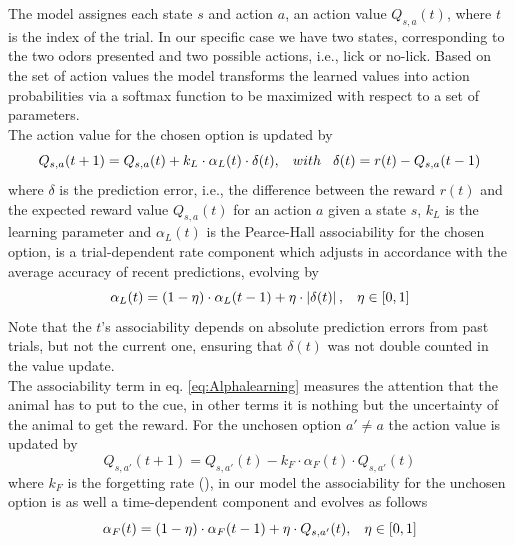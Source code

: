 The model assignes each state $s$ and action $a$, an action value $Q_{s,a}(t)$, where $t$ is the index of the trial. In our specific case we have two states, corresponding to the two odors presented and two possible actions, i.e., lick or no-lick. 
Based on the set of action values the model transforms the learned values into action probabilities via a softmax function to be maximized with respect to a set of parameters.\\The action value for the chosen option is updated by
\begin{equation}
Q_{s,a}(t+1)  = Q_{s,a}(t)+k_L\cdot\alpha_L(t)\cdot\delta(t), \hspace{0.3cm} with \hspace{0.3cm}\delta(t)=r(t)-Q_{s,a}(t-1)
\label{eq:Qlearning}
\end{equation}
where $\delta$ is the prediction error, i.e., the difference between the reward $r(t)$ and the expected reward value $Q_{s,a}(t)$ for an action $a$ given a state $s$, $k_L$ is the learning parameter and $\alpha_L(t)$ is the Pearce-Hall associability for the chosen option, is a trial-dependent rate component which adjusts in accordance with the average accuracy of recent predictions, evolving by
\begin{equation}
   \alpha_L(t)=(1-\eta)\cdot\alpha_L(t-1)+\eta\cdot\left\lvert\delta(t)\right\rvert,\hspace{0.3cm} \eta\in[0,1]
    \label{eq:Alphalearning}
\end{equation}
Note that the $t$'s associability depends on absolute prediction errors from past trials, but not the current one, ensuring that $\delta(t)$ was not double counted in the value update.\\The associability term in eq. \ref{eq:Alphalearning} measures the attention that the animal has to put to the cue, in other terms it is nothing but the uncertainty of the animal to get the reward. 
For the unchosen option $a'\neq a$ the action value is updated by
\begin{equation}
    Q_{s,a'}(t+1) = Q_{s,a'}(t)-k_F\cdot\alpha_F(t)\cdot Q_{s,a'}(t)
    \label{eq:Qforgetting}
\end{equation}
where $k_F$ is the forgetting rate (\cite{ItoDoya1}), in our model the associability for the unchosen option is as well a time-dependent component and evolves as follows
\begin{equation}
    \alpha_F(t)=(1-\eta)\cdot\alpha_F(t-1)+\eta\cdot Q_{s,a'}(t), \hspace{0.3cm}
    \eta\in[0,1]
    \label{eq:Alphaforgetting}
\end{equation}
